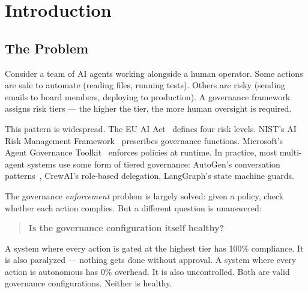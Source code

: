 \documentclass[sigconf,nonacm]{acmart}
\begin{document}


\maketitle

\section{Introduction}

\subsection{The Problem}

Consider a team of AI agents working alongside a human operator. Some
actions are safe to automate (reading files, running tests). Others are
risky (sending emails to board members, deploying to production). A
governance framework assigns risk tiers --- the higher the tier, the more
human oversight is required.

This pattern is widespread. The EU AI Act~\cite{euaiact} defines four risk
levels. NIST's AI Risk Management Framework~\cite{nist} prescribes
governance functions. Microsoft's Agent Governance Toolkit~\cite{microsoft}
enforces policies at runtime. In practice, most multi-agent systems use
some form of tiered governance: AutoGen's conversation
patterns~\cite{autogen}, CrewAI's role-based delegation, LangGraph's state
machine guards.

The governance \emph{enforcement} problem is largely solved: given a
policy, check whether each action complies. But a different question is
unanswered:

\begin{quote}
\textbf{Is the governance configuration itself healthy?}
\end{quote}

A system where every action is gated at the highest tier has 100\%
compliance. It is also paralyzed --- nothing gets done without approval.
A system where every action is autonomous has 0\% overhead. It is also
uncontrolled. Both are valid governance configurations. Neither is healthy.
\end{document}

